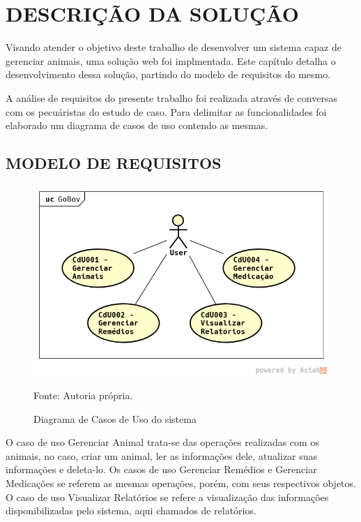 %
%


\chapter{\textbf{DESCRIÇÃO DA SOLUÇÃO}}\label{chap:descSolucao}

Visando atender o objetivo deste trabalho de desenvolver um sistema capaz de gerenciar animais, uma solução web foi implmentada. Este capítulo detalha o desenvolvimento dessa solução, partindo do modelo de requisitos do mesmo.

A análise de requisitos do presente trabalho foi realizada através de conversas com os pecuáristas do estudo de caso. Para delimitar as funcionalidades foi elaborado um diagrama de casos de uso contendo as mesmas.

\section{MODELO DE REQUISITOS}

\begin{figure}[H]
	\begin{center}
		\caption{Diagrama de Casos de Uso do sistema}
		\includegraphics[width=\textwidth]{../img/casosdeuso.png}

		Fonte: Autoria própria.
	\end{center}
\end{figure}

O caso de uso Gerenciar Animal trata-se das operações realizadas com os animais, no caso, criar um animal, ler as informações dele, atualizar suas informações e deleta-lo. Os casos de uso Gerenciar Remédios e Gerenciar Medicações se referem as mesmas operações, porém, com seus respectivos objetos. O caso de uso Visualizar Relatórios se refere a visualização das informações disponibilizadas pelo sistema, aqui chamados de relatórios.


